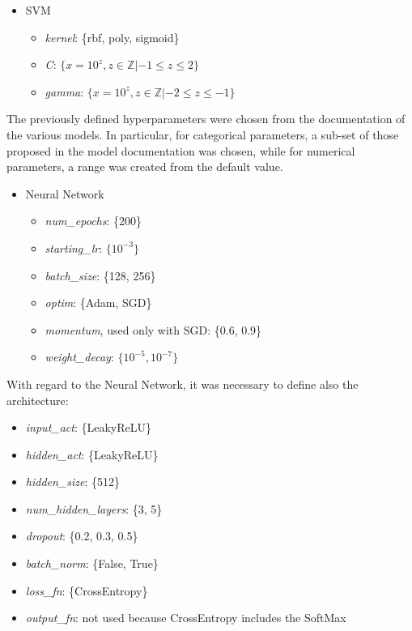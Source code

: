 \documentclass[../main]{subfiles}
\begin{document}
\begin{itemize}
    \item SVM
    \begin{itemize}
        \item \textit{kernel}: \{rbf, poly, sigmoid\}
        \item \textit{C}: $\{x = 10^z, z \in \mathbb{Z}|-1 \leq z \leq 2\}$
        \item \textit{gamma}: $\{x = 10^z, z \in \mathbb{Z}|-2 \leq z \leq -1\}$
    \end{itemize}
\end{itemize}
\newpage
The previously defined hyperparameters were chosen from the documentation of the various models.
In particular, for categorical parameters, a sub-set of those proposed in the model documentation was chosen, while for numerical parameters, a range was created from the default value.
\begin{itemize}
    \item Neural Network
    \begin{itemize}
        \item \textit{num\_epochs}: \{200\}
        \item \textit{starting\_lr}: $\{10^{-3}\}$
        \item \textit{batch\_size}: \{128, 256\}
        \item \textit{optim}: \{Adam, SGD\}
        \item \textit{momentum}, used only with SGD: \{0.6, 0.9\}
        \item \textit{weight\_decay}: $\{10^{-5}, 10^{-7}\}$
    \end{itemize}
\end{itemize}

With regard to the Neural Network, it was necessary to define also the architecture:
\begin{itemize}
    \item \textit{input\_act}: \{LeakyReLU\}
    \item \textit{hidden\_act}: \{LeakyReLU\}
    \item \textit{hidden\_size}: \{512\}
    \item \textit{num\_hidden\_layers}: \{3, 5\}
    \item \textit{dropout}: \{0.2, 0.3, 0.5\}
    \item \textit{batch\_norm}: \{False, True\}
    \item \textit{loss\_fn}: \{CrossEntropy\}
    \item \textit{output\_fn}: not used because CrossEntropy includes the SoftMax
\end{itemize}
\end{document}
